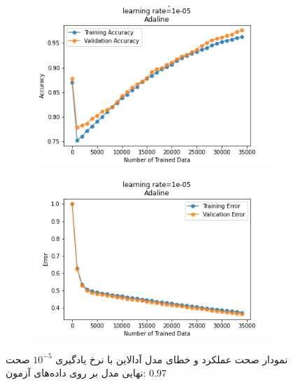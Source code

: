 \documentclass[12pt, a4paper]{article}
\begin{document}
\begin{figure}[h]
    \begin{subfigure}{0.45\linewidth}
        \centering
        \includegraphics[width=\linewidth]{images/3/adaline/lr/acc_1e-05.png}
    \end{subfigure}
    \hfil
    \begin{subfigure}{0.45\linewidth}
        \centering
        \includegraphics[width=\linewidth]{images/3/adaline/lr/error_1e-05.png}
    \end{subfigure}
    \caption{نمودار صحت عملکرد‌ و خطای مدل آدالاین با نرخ یادگیری $10^{-5}$
    \newline
    صحت نهایی مدل بر روی داده‌های آزمون: $0.97$}
\end{figure}
\end{document}
